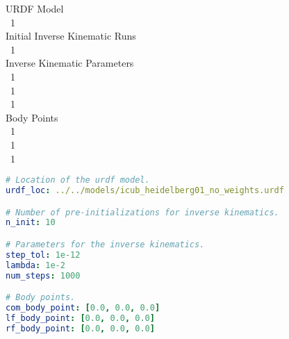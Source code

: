 \begin{minipage}{1.\textwidth}
	\begin{minipage}{0.3\textwidth}
		\scriptsize{
			\hfill URDF Model\\
			\mbox{}~\hfill 1\\
			
			\hfill Initial Inverse Kinematic Runs\\
			\mbox{}~\hfill 1\\
			
			\hfill Inverse Kinematic Parameters\\
			\mbox{}~\hfill 1\\
			\mbox{}~\hfill 1\\
			\mbox{}~\hfill 1\\
			
			\hfill Body Points\\
			\mbox{}~\hfill 1\\
			\mbox{}~\hfill 1\\
			\mbox{}~\hfill 1}
	\end{minipage}
	\begin{minipage}{0.7\textwidth}
		\begin{lstlisting}[language=yaml]
# Location of the urdf model.
urdf_loc: ../../models/icub_heidelberg01_no_weights.urdf

# Number of pre-initializations for inverse kinematics.
n_init: 10

# Parameters for the inverse kinematics.
step_tol: 1e-12
lambda: 1e-2
num_steps: 1000

# Body points.
com_body_point: [0.0, 0.0, 0.0]
lf_body_point: [0.0, 0.0, 0.0]
rf_body_point: [0.0, 0.0, 0.0]
		\end{lstlisting}
	\end{minipage}
\end{minipage}
